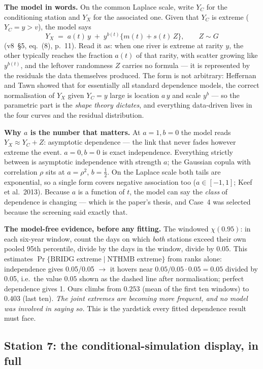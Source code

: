 \documentclass[11pt]{article}
\begin{document}
\textbf{The model in words.} On the common Laplace scale, write $Y_C$ for the
conditioning station and $Y_X$ for the associated one. Given that $Y_C$ is
extreme ($Y_C = y > v$), the model says
\[
Y_X \;=\; a(t)\,y \;+\; y^{b(t)}\bigl\{m(t) + s(t)\,Z\bigr\},
\qquad Z \sim G
\]
(v8~\S5, eq.~(8), p.~11). Read it as: when one river is extreme at rarity
$y$, the other typically reaches the fraction $a(t)$ of that rarity, with
scatter growing like $y^{b(t)}$, and the leftover randomness $Z$ carries no
formula --- it is represented by the residuals the data themselves produced.
The form is not arbitrary: Heffernan and Tawn showed that for essentially all
standard dependence models, the correct normalisation of $Y_X$ given
$Y_C = y$ large is location $a\,y$ and scale $y^{b}$ --- so the parametric
part is the \emph{shape theory dictates}, and everything data-driven lives in
the four curves and the residual distribution.

\textbf{Why $a$ is the number that matters.} At $a=1, b=0$ the model reads
$Y_X \approx Y_C + Z$: asymptotic dependence --- the link that never fades
however extreme the event. $a=0, b=0$ is exact independence. Everything
strictly between is asymptotic independence with strength $a$; the Gaussian
copula with correlation $\rho$ sits at $a = \rho^2$, $b = \tfrac12$. On the
Laplace scale both tails are exponential, so a single form covers negative
association too ($a \in [-1,1]$; Keef et al.\ 2013). Because $a$ is a
function of $t$, the model can say the \emph{class} of dependence is
changing --- which is the paper's thesis, and Case~4 was selected because the
screening said exactly that.

\textbf{The model-free evidence, before any fitting.} The windowed
$\chi(0.95)$: in each six-year window, count the days on which \emph{both}
stations exceed their own pooled 95th percentile, divide by the days in the
window, divide by 0.05. This estimates
$\Pr\{\text{BRIDG extreme} \mid \text{NTHMB extreme}\}$ from ranks alone:
independence gives 0.05/0.05 $\to$ it hovers near $0.05/0.05 \cdot 0.05
= 0.05$ divided by 0.05, i.e.\ the value $0.05$ shown as the dashed line
after normalisation; perfect dependence gives 1. Ours climbs from $0.253$
(mean of the first ten windows) to $0.403$ (last ten). \emph{The joint
extremes are becoming more frequent, and no model was involved in saying
so.} This is the yardstick every fitted dependence result must face.

\subsection{Station 7: the conditional-simulation display, in full}
\label{sec:pseudo}
\end{document}
